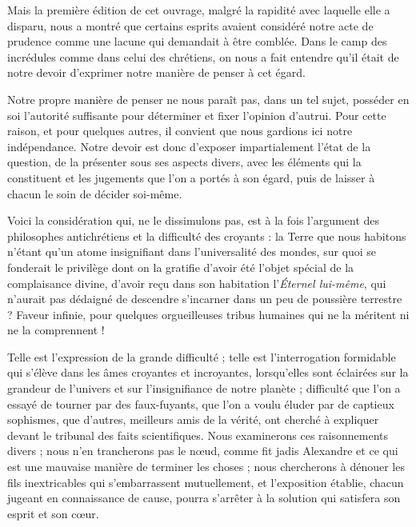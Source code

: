 \documentclass[a4paper, 11pt, oneside]{article}
\begin{document}
Mais la première édition de cet ouvrage, malgré la rapidité avec laquelle elle a disparu, nous a montré que certains esprits avaient considéré notre acte de prudence comme une lacune qui demandait à être comblée. Dans le camp des incrédules comme dans celui des chrétiens, on nous a fait entendre qu'il était de notre devoir d'exprimer notre manière de penser à cet égard.

Notre propre manière de penser ne nous paraît pas, dans un tel sujet, posséder en soi l'autorité suffisante pour déterminer et fixer l'opinion d'autrui. Pour cette raison, et pour quelques autres, il convient que nous gardions ici notre indépendance. Notre devoir est donc d'exposer impartialement l'état de la question, de la présenter sous ses aspects divers, avec les éléments qui la constituent et les jugements que l'on a portés à son égard, puis de laisser à chacun le soin de décider soi-même.

Voici la considération qui, ne le dissimulons pas, est à la fois l'argument des philosophes antichrétiens et la difficulté des croyants : la Terre que nous habitons n'étant qu'un atome insignifiant dans l'universalité des mondes, sur quoi se fonderait le privilège dont on la gratifie d'avoir été l'objet spécial de la complaisance divine, d'avoir reçu dans son habitation l'\emph{Éternel lui-même}, qui n'aurait pas dédaigné de descendre s'incarner dans un peu de poussière terrestre ? Faveur infinie, pour quelques orgueilleuses tribus humaines qui ne la méritent ni ne la comprennent !

Telle est l'expression de la grande difficulté ; telle est l'interrogation formidable qui s'élève dans les âmes croyantes et incroyantes, lorsqu'elles sont éclairées sur la grandeur de l'univers et sur l'insignifiance de notre planète ; difficulté que l'on a essayé de tourner par des faux-fuyants, que l'on a voulu éluder par de captieux sophismes, que d'autres, meilleurs amis de la vérité, ont cherché à expliquer devant le tribunal des faits scientifiques. Nous examinerons ces raisonnements divers ; nous n'en trancherons pas le nœud, comme fit jadis Alexandre et ce qui est une mauvaise manière de terminer les choses ; nous chercherons à dénouer les fils inextricables qui s'embarrassent mutuellement, et l'exposition établie, chacun jugeant en connaissance de cause, pourra s'arrêter à la solution qui satisfera son esprit et son cœur.
\end{document}
